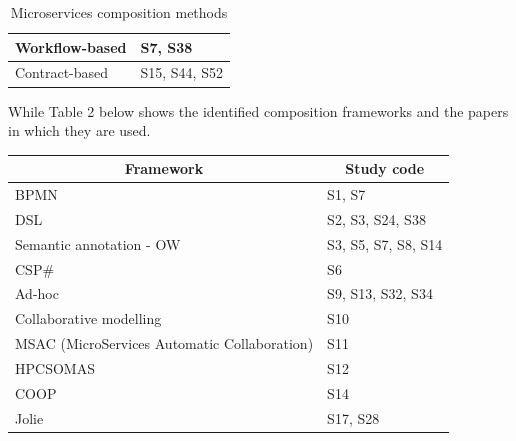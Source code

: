 \documentclass{article}
\begin{document}
\begin{multicols}{2}
\begin{table}[ht!]
\begin{center}
\begin{tabular}{ | m{20em} | m{20em} | }
Workflow-based                                                    & S7,   S38                                                                                               \\ \hline
Contract-based                                                    & S15,   S44, S52                                                                                         \\ \hline
\end{tabular}
\end{center}
\caption{Microservices composition methods}
\label{table:1}
\end{table}

While Table 2 below shows the identified composition frameworks and the papers in which they are used.

\begin{table}[ht!]
\begin{center}
\scriptsize
\begin{tabular}{ | m{20em} | m{20em} | }
\hline
\multicolumn{1}{|c|}{\textbf{Framework}}     & \multicolumn{1}{c|}{\textbf{Study   code}} \\ \hline
BPMN                                         & S1,   S7                                   \\ \hline
DSL                                          & S2,   S3, S24, S38                         \\ \hline
Semantic   annotation - OW                   & S3,   S5, S7, S8, S14                      \\ \hline
CSP\#                                        & S6                                         \\ \hline
Ad-hoc                                       & S9,   S13, S32, S34                        \\ \hline
Collaborative   modelling                    & S10                                        \\ \hline
MSAC (MicroServices Automatic Collaboration) & S11                                        \\ \hline
HPCSOMAS                                     & S12                                        \\ \hline
COOP                                         & S14                                        \\ \hline
Jolie                                        & S17,   S28                                 \\ \hline

\end{tabular}
\end{center}
\end{table}
\end{multicols}
\end{document}
